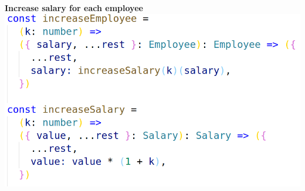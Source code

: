 \documentclass[14pt]{beamer}
\begin{document}
\begin{frame}
  \centering\textbf{Increase salary for each employee}
  \vfill
  \includegraphics[height=0.9\textheight,width=\textwidth,keepaspectratio]{graphics/increase-naive-step3-ts.png}
\end{frame}
\end{document}
